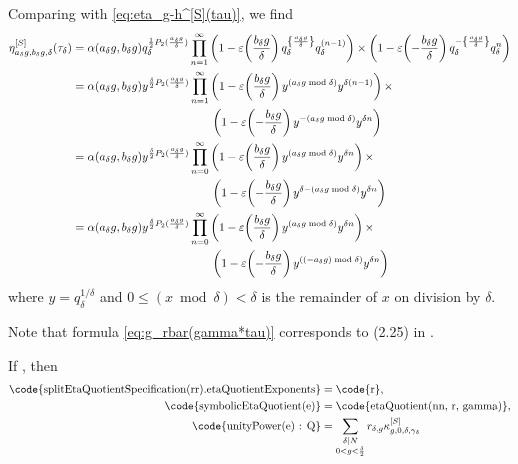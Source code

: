 \documentclass{article}
\begin{document}
Comparing with \eqref{eq:eta_g-h^[S](tau)}, we find
\begin{align*}
  \eta_{a_\delta g, b_\delta g,\delta}^{[S]}(\tau_\delta)
  &=
    \alpha(a_\delta g, b_\delta g)
    q_\delta^{\frac{1}{2}P_2(\frac{a_\delta g}{\delta})}
    \prod_{n=1}^\infty
    \left(
    1 - \unityPower{\frac{b_\delta g}{\delta}}
    q_\delta^{\left\{ \frac{a_\delta g}{\delta} \right\}}
    q_\delta^{(n-1)}
    \right) \times
    \left(
    1 - \unityPower{- \frac{b_\delta g}{\delta}}
    q_\delta^{- \left\{ \frac{a_\delta g}{\delta} \right\}}
    q_\delta^n
    \right)
  \\
  &=
    \alpha(a_\delta g, b_\delta g)
    y^{\frac{\delta}{2}P_2(\frac{a_\delta g}{\delta})}
    \prod_{n=1}^\infty
    \left(
    1 - \unityPower{\frac{b_\delta g}{\delta}}
    y^{(a_\delta g \bmod \delta)}
    y^{\delta (n-1)}
    \right) \times
  \\&\qquad\qquad\qquad\qquad\qquad\qquad
    \left(
    1 - \unityPower{- \frac{b_\delta g}{\delta}}
    y^{- (a_\delta g \bmod \delta)}
    y^{\delta n}
    \right)
  \\
  &=
    \alpha(a_\delta g, b_\delta g)
    y^{\frac{\delta}{2}P_2(\frac{a_\delta g}{\delta})}
    \prod_{n=0}^\infty
    \left(
    1 - \unityPower{\frac{b_\delta g}{\delta}}
    y^{(a_\delta g \bmod \delta)}
    y^{\delta n}
    \right) \times
  \\&\qquad\qquad\qquad\qquad\qquad\qquad
    \left(
    1 - \unityPower{- \frac{b_\delta g}{\delta}}
    y^{\delta - (a_\delta g \bmod \delta)}
    y^{\delta n}
    \right)
  \\
  &=
    \alpha(a_\delta g, b_\delta g)
    y^{\frac{\delta}{2}P_2(\frac{a_\delta g}{\delta})}
    \prod_{n=0}^\infty
    \left(
    1 - \unityPower{\frac{b_\delta g}{\delta}}
    y^{(a_\delta g \bmod \delta)}
    y^{\delta n}
    \right) \times
  \\&\qquad\qquad\qquad\qquad\qquad\qquad
    \left(
    1 - \unityPower{- \frac{b_\delta g}{\delta}}
    y^{((-a_\delta g) \bmod \delta)}
    y^{\delta n}
    \right)
\end{align*}
where $y = q_\delta^{1/\delta}$ and $0 \le (x \bmod \delta) < \delta$
is the remainder of $x$ on division by $\delta$.


Note that formula \eqref{eq:g_rbar(gamma*tau)} corresponds to (2.25)
in \cite{Chen+Du+Zhao:FindingModularFunctionsRamanujan:2019}.

If , then
\begin{align*}
  \text{\code{splitEtaQuotientSpecification(rr).etaQuotientExponents}}
  &=
    \text{\code{r}},
  \\
  \text{\code{symbolicEtaQuotient(e)}}
  &=
    \text{\code{etaQuotient(nn, r, gamma)}},
  \\
  \text{\code{unityPower(e) : Q}}
  &=
    \sum_{\substack{\divides{\delta}{N}\\0 < g < \frac{\delta}{2}}}
      r_{\delta,g} \kappa_{g,0,\delta,\gamma_\delta}^{[S]}
\end{align*}
\end{document}
